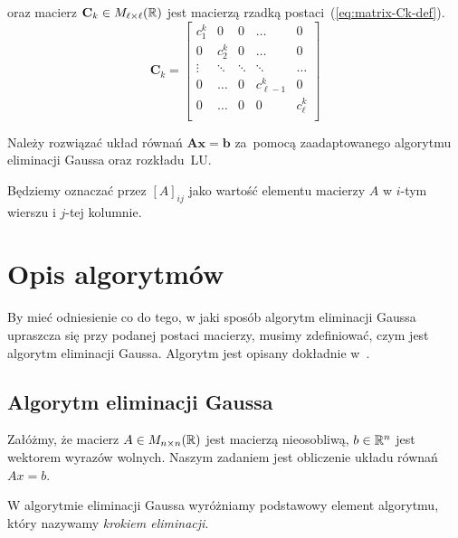 \documentclass[../main.tex]{subfiles}
\newcommand{\AAA}{\mathbf{A}}
\newcommand{\CCC}{\mathbf{C}}
\begin{document}
    oraz macierz \( \CCC_k \in M_{\ell \times \ell}(\RR) \) jest macierzą rzadką
    postaci~(\ref{eq:matrix-Ck-def}).
    \begin{equation} \label{eq:matrix-Ck-def}
      \CCC_k = \begin{bmatrix}
        c^k_1   & 0       & 0       & \hdots        & 0         \\
        0       & c^k_2   & 0       & \hdots        & 0         \\
        \vdots  & \ddots  & \ddots  & \ddots        & \hdots    \\
        0       & \hdots  & 0       & c^k_{\ell-1}  & 0         \\
        0       & \hdots  & 0       & 0             & c^k_\ell  \\
      \end{bmatrix}
    \end{equation}
    
    \begin{problem}
      Należy rozwiązać układ równań \( \AAA \mathbf{x} = \mathbf{b} \)
      za~pomocą zaadaptowanego algorytmu eliminacji Gaussa
      oraz rozkładu~LU.
    \end{problem}
    \begin{remark}
      Będziemy oznaczać przez \( [A]_{ij} \) jako wartość elementu macierzy \( A \)
      w \( i \)-tym wierszu i \( j \)-tej kolumnie.
    \end{remark}

    \section{Opis algorytmów}
    
    By mieć odniesienie co do tego, w jaki sposób algorytm eliminacji Gaussa
    upraszcza się przy podanej postaci macierzy, musimy zdefiniować, czym jest
    algorytm eliminacji Gaussa. Algorytm jest opisany dokładnie w~\cite{kielb92}.

    \subsection{Algorytm eliminacji Gaussa}
    Załóżmy, że macierz \( A \in M_{n \times n}(\mathbb{R}) \) jest macierzą nieosobliwą,
    \( b \in \mathbb{R}^n \) jest wektorem wyrazów wolnych. Naszym zadaniem
    jest obliczenie układu równań \( Ax = b \).

    W algorytmie eliminacji Gaussa wyróżniamy podstawowy element algorytmu,
    który nazywamy \emph{krokiem eliminacji}.
\end{document}
